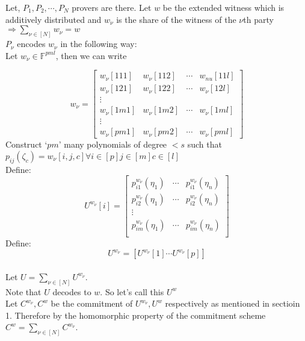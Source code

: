 Let, $P_1,P_2,\cdots,P_N$ provers are there. Let $w$ be the extended witness which is additively distributed and $w_{\nu}$ is the share of the witness of the $\nu$th party $\Rightarrow \sum\limits_{\nu \in [N]}w_{\nu}=w$\\
$P_{\nu}$ encodes $w_{\nu}$ in the following way:\\
Let $w_{\nu}\in \mathbb{F}^{pml}$, then we can write 

$$w_{\nu} = 
\begin{bmatrix}
w_{\nu}[111] & w_{\nu}[112] & \cdots & w_{nu}[11l]\\
w_{\nu}[121] & w_{\nu}[122] & \cdots & w_{\nu}[12l]\\
\vdots\\
w_{\nu}[1m1] & w_{\nu}[1m2] & \cdots & w_{\nu}[1ml]\\
\vdots\\
w_{\nu}[pm1] & w_{\nu}[pm2] & \cdots & w_{\nu}[pml]
\end{bmatrix}
$$
Construct `$pm$' many polynomials of degree $<s$ such that $p_{ij}(\zeta_c)=w_{\nu}[i,j,c]\forall i\in [p] j\in [m] c\in[l]$\\
Define: 
$$U^{w_{\nu}}[i]=
\begin{bmatrix}
p_{i1}^{w_{\nu}}(\eta_1) & \cdots & p_{i1}^{w_{\nu}}(\eta_n)\\
p_{i2}^{w_{\nu}}(\eta_1) & \cdots & p_{i2}^{w_{\nu}}(\eta_n)\\
\vdots\\
p_{im}^{w_{\nu}}(\eta_1) & \cdots & p_{im}^{w_{\nu}}(\eta_n)\\
\end{bmatrix}
$$
Define: $$U^{w_{\nu}}=[U^{w_{\nu}}[1] \cdots U^{w_{\nu}}[p]]$$\\
Let $U=\sum\limits_{\nu \in [N]} U^{w_{\nu}}$.\\
Note that $U$ decodes to $w$. So let's call this $U^w$\\
Let $C^{w_{\nu}}, C^w$ be the commitment of $U^{w_{\nu}}, U^w$ respectively as mentioned in sectioin 1. Therefore by the homomorphic property of the commitment scheme $C^w=\sum\limits_{\nu \in [N]} C^{w_{\nu}}$.\\
